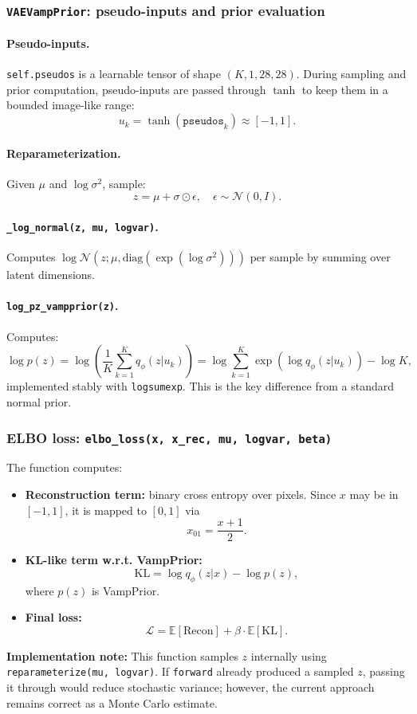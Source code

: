 \subsubsection*{\texttt{VAEVampPrior}: pseudo-inputs and prior evaluation}
\paragraph{Pseudo-inputs.}
\texttt{self.pseudos} is a learnable tensor of shape \((K,1,28,28)\). During sampling and prior computation, pseudo-inputs are passed through \(\tanh\) to keep them in a bounded image-like range:
\[
u_k = \tanh(\texttt{pseudos}_k)\approx[-1,1].
\]

\paragraph{Reparameterization.}
Given \(\mu\) and \(\log\sigma^2\), sample:
\[
z=\mu + \sigma\odot\epsilon,\quad \epsilon\sim\mathcal{N}(0,I).
\]

\paragraph{\texttt{\_log\_normal(z, mu, logvar)}.}
Computes \(\log \mathcal{N}(z;\mu,\mathrm{diag}(\exp(\log\sigma^2)))\) per sample by summing over latent dimensions.

\paragraph{\texttt{log\_pz\_vampprior(z)}.}
Computes:
\[
\log p(z)=\log\left(\frac{1}{K}\sum_{k=1}^K q_\phi(z|u_k)\right)
= \log\sum_{k=1}^K \exp(\log q_\phi(z|u_k)) - \log K,
\]
implemented stably with \texttt{logsumexp}. This is the key difference from a standard normal prior.

\subsubsection*{ELBO loss: \texttt{elbo\_loss(x, x\_rec, mu, logvar, beta)}}
The function computes:
\begin{itemize}
  \item \textbf{Reconstruction term:} binary cross entropy over pixels.
  Since \(x\) may be in \([-1,1]\), it is mapped to \([0,1]\) via
  \[
  x_{01} = \frac{x+1}{2}.
  \]
  \item \textbf{KL-like term w.r.t. VampPrior:}
  \[
  \mathrm{KL} = \log q_\phi(z|x) - \log p(z),
  \]
  where \(p(z)\) is VampPrior.
  \item \textbf{Final loss:}
  \[
  \mathcal{L} = \mathbb{E}[\mathrm{Recon}] + \beta \cdot \mathbb{E}[\mathrm{KL}].
  \]
\end{itemize}
\textbf{Implementation note:} This function samples \(z\) internally using \texttt{reparameterize(mu, logvar)}. If \texttt{forward} already produced a sampled \(z\), passing it through would reduce stochastic variance; however, the current approach remains correct as a Monte Carlo estimate.

